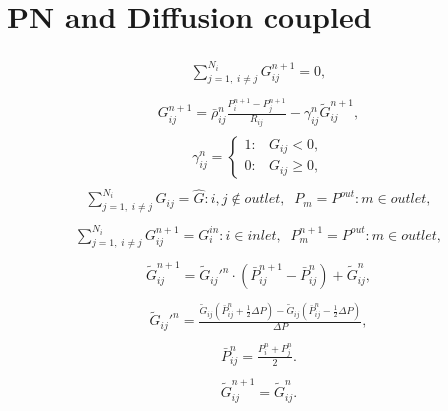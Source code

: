 \documentclass[a4paper,12pt]{extreport}
\begin{document}
    \section*{PN and Diffusion coupled}

   \begin{eqnarray}
   \label{eq:main_coupled_sle}
   \begin{gathered}
   \sum^{N_{i}}_{j=1, \; i\neq j} G^{n+1}_{ij} = 0,
   \end{gathered}
   \end{eqnarray}
   \begin{eqnarray}
   \label{eq:mass_flux_coupled}
   \begin{gathered}
   G^{n+1}_{ij} = \bar{\rho}_{ij}^n \frac{P^{n+1}_{i} - P^{n+1}_{j}}{R_{ij}} - \gamma^n_{ij} \tilde{G}^{n+1}_{ij},
   \end{gathered}
   \end{eqnarray}
\begin{eqnarray}
\label{eq:gamma}
\gamma^n_{ij} =\begin{cases}
1: & G_{ij} < 0,\\
0: & G_{ij} \geqslant 0,
\end{cases}
\end{eqnarray}
\begin{eqnarray}
\label{eq:bc_gamma}
\begin{gathered}
\sum^{N_{i}}_{j=1, \; i\neq j} G_{ij} = \hat{G} : i, j \notin outlet,\;\;
P_{m} = P^{out}   : m \in outlet,
\end{gathered}
\end{eqnarray}
%
\begin{eqnarray}
\label{eq:bc_coupled}
\begin{gathered}
\sum^{N_{i}}_{j=1, \; i\neq j} G^{n+1}_{ij} = G^{in}_{i} : i \in inlet,\;\;
P^{n+1}_{m} = P^{out}   : m \in outlet,
\end{gathered}
\end{eqnarray}
%
\begin{eqnarray}
\begin{gathered}
\tilde{G}_{ij}^{n+1} = \tilde{G}_{ij}'^n \cdot \left(\bar{P}_{ij}^{n+1}-\bar{P}_{ij}^n\right)+\tilde{G}_{ij}^n,
\end{gathered}
\end{eqnarray}
%
\begin{eqnarray}
\begin{gathered}
\tilde{G}_{ij}'^n = \frac{\tilde{G}_{ij}\left(\bar{P}_{ij}^n+ \frac{1}{2}\Delta P\right)-
	\tilde{G}_{ij}\left(\bar{P}_{ij}^n-\frac{1}{2}\Delta P\right)}{{\Delta P}},
\end{gathered}
\end{eqnarray}
%
\begin{eqnarray}
\begin{gathered}
\bar{P}^{n}_{ij} = \frac{P^n_i+P^n_j}{2}.
\end{gathered}
\end{eqnarray}
%
\begin{eqnarray}
\begin{gathered}
\tilde{G}_{ij}^{n+1} = \tilde{G}_{ij}^n.
\end{gathered}
\end{eqnarray}
\end{document}
